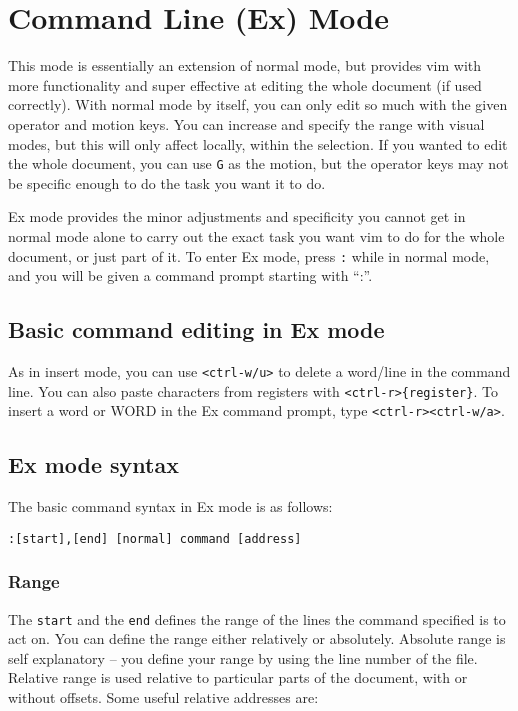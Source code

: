 \section{Command Line (Ex) Mode}

This mode is essentially an extension of normal mode, but provides vim with more functionality and super effective at editing the whole document (if used correctly).
With normal mode by itself, you can only edit so much with the given operator and motion keys.
You can increase and specify the range with visual modes, but this will only affect locally, within the selection.
If you wanted to edit the whole document, you can use \verb|G| as  the motion, but the operator keys may not be specific enough to do the task you want it to do.

Ex mode provides the minor adjustments and specificity you cannot get in normal mode alone to carry out the exact task you want vim to do for the whole document, or just part of it.
To enter Ex mode, press \verb|:| while in normal mode, and you will be given a command prompt starting with ``:''.

\subsection{Basic command editing in Ex mode}

As in insert mode, you can use \verb|<ctrl-w/u>| to delete a word/line in the command line.
You can also paste characters from registers with \verb|<ctrl-r>{register}|.
To insert a word or WORD in the Ex command prompt, type \verb|<ctrl-r><ctrl-w/a>|.


\newpage

\subsection{Ex mode syntax}

The basic command syntax in Ex mode is as follows:

\begin{center}
    \verb|:[start],[end] [normal] command [address]|
\end{center}

\subsubsection{Range}

The \verb|start| and the \verb|end| defines the range of the lines the command specified is to act on.
You can define the range either relatively or absolutely.
Absolute range is self explanatory -- you define your range by using the line number of the file.
Relative range is used relative to particular parts of the document, with or without offsets.
Some useful relative addresses are:
\newline

